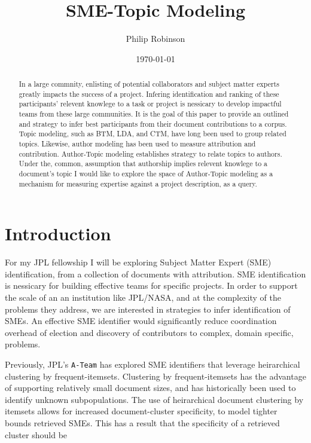 \documentclass{article}
\title{SME-Topic Modeling}
\date{\today}
\author{Philip Robinson}
\affil{NASA: Jet Propoultion Labratory}
\begin{document}
\maketitle

\begin{abstract}
In a large commnity, enlisting of potential collaborators and subject matter experts greatly impacts the success of a project. Infering identification and ranking of these participants' relevent knowlege to a task or project is nessicary to develop impactful teams from these large communities\cite{Minto2007}. It is the goal of this paper to provide an outlined and strategy to infer best participants from their document contributions to a corpus. Topic modeling, such as BTM\cite{Yan2013}, LDA, and CTM, have long been used to group related topics\cite{Alghamdi2015}. Likewise, author modeling has been used to measure attribution\cite{Rexha2018} and contribution\cite{AldebeiHJ016}. Author-Topic modeling establishes strategy to relate topics to authors\cite{Rosen-Zvi2004}. Under the, common, assumption that authorship implies relevent knowlege to a document's topic I would like to explore the space of Author-Topic modeling as a mechanism for measuring expertise against a project description, as a query.
\end{abstract}


\section{Introduction}
For my JPL fellowship I will be exploring Subject Matter Expert (SME) identification, from a collection of documents with attribution. SME identification is nessicary for building effective teams for specific projects. In order to support the scale of an an institution like JPL/NASA, and at the complexity of the problems they address, we are interested in strategies to infer identification of SMEs. An effective SME identifier would significantly reduce coordination overhead of election and discovery of contributors to complex, domain specific, problems.

Previously, JPL's \texttt{A-Team} has explored SME identifiers that leverage heirarchical clustering by frequent-itemsets\cite{wang2003,kiran2010}. Clustering by frequent-itemsets has the advantage of supporting relatively small document sizes, and has historically been used to identify unknown subpopulations. The use of heirarchical document clustering by itemsets allows for increased document-cluster specificity, to model tighter bounds retrieved SMEs. This has a result that the specificity of a retrieved cluster should be
\end{document}
